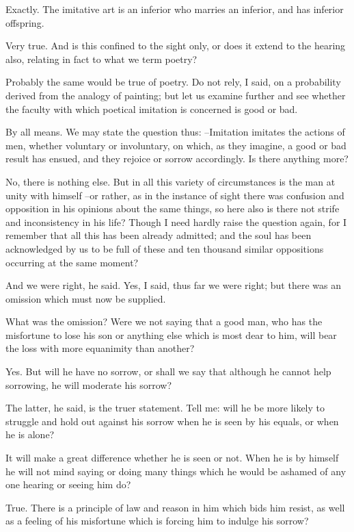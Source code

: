 Exactly.
The imitative art is an inferior who marries an inferior, and has inferior offspring.

Very true.
And is this confined to the sight only, or does it extend to the hearing also, relating in fact to what we term poetry?

Probably the same would be true of poetry.
Do not rely, I said, on a probability derived from the analogy of painting; but let us examine further and see whether the faculty with which poetical imitation is concerned is good or bad.

By all means.
We may state the question thus: --Imitation imitates the actions of men, whether voluntary or involuntary, on which, as they imagine, a good or bad result has ensued, and they rejoice or sorrow accordingly. Is there anything more?

No, there is nothing else.
But in all this variety of circumstances is the man at unity with himself --or rather, as in the instance of sight there was confusion and opposition in his opinions about the same things, so here also is there not strife and inconsistency in his life? Though I need hardly raise the question again, for I remember that all this has been already admitted; and the soul has been acknowledged by us to be full of these and ten thousand similar oppositions occurring at the same moment?

And we were right, he said.
Yes, I said, thus far we were right; but there was an omission which must now be supplied.

What was the omission?
Were we not saying that a good man, who has the misfortune to lose his son or anything else which is most dear to him, will bear the loss with more equanimity than another?

Yes.
But will he have no sorrow, or shall we say that although he cannot help sorrowing, he will moderate his sorrow?

The latter, he said, is the truer statement.
Tell me: will he be more likely to struggle and hold out against his sorrow when he is seen by his equals, or when he is alone?

It will make a great difference whether he is seen or not.
When he is by himself he will not mind saying or doing many things which he would be ashamed of any one hearing or seeing him do?

True.
There is a principle of law and reason in him which bids him resist, as well as a feeling of his misfortune which is forcing him to indulge his sorrow?

